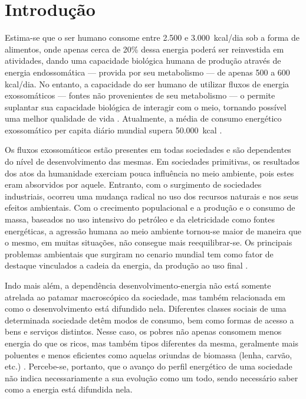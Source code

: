 \chapter{Introdução}

Estima-se que o ser humano consome entre 2.500 e 3.000~\acrshort{kcal}/dia sob a 
forma de alimentos, onde apenas cerca de 20\% dessa energia poderá ser 
reinvestida em atividades, dando uma capacidade biológica humana de produção
através de energia endossomática --- provida por seu metabolismo --- de 
apenas 500 a 600 \acrshort{kcal}/dia. No entanto, a capacidade do ser humano de
utilizar fluxos de energia exossomáticos --- fontes não provenientes de seu metabolismo 
--- o permite suplantar sua capacidade biológica de interagir com o meio,
tornando possível uma melhor qualidade de vida \cite{rippel}. 
Atualmente, a média de consumo energético exossomático per capita diário 
mundial supera 50.000~\acrshort{kcal} \cite{world_statics_2012}.

Os fluxos exossomáticos estão presentes em todas sociedades e são dependentes do
nível de desenvolvimento das mesmas. Em sociedades primitivas, os resultados dos
atos da humanidade exerciam pouca influência no meio ambiente, pois estes eram
absorvidos por aquele. Entranto, com o surgimento de sociedades industriais,
ocorreu uma mudança radical no uso dos recursos naturais e nos seus efeitos
ambientais. Com o crecimento populacional e a produção e o consumo de massa, 
baseados no uso intensivo do petróleo e da eletricidade 
como fontes energéticas, a agressão humana ao meio 
ambiente tornou-se maior de maneira que o mesmo, em muitas situações, não 
consegue mais reequilibrar-se. Os principais problemas ambientais que surgiram 
no cenario mundial tem como fator de destaque vinculados a cadeia da energia, 
da produção ao uso final \cite{rippel,jatoba}.

Indo mais além, a dependência desenvolvimento-energia não está somente atrelada
ao patamar macroscópico da sociedade, mas também relacionada em como o
desenvolvimento está difundido nela. Diferentes classes sociais de uma
determinada sociedade detêm modos de consumo, bem como formas de acesso a bens e
serviços distintos. Nesse caso, os pobres não apenas consomem menos
energia do que os ricos, mas também tipos diferentes da mesma, geralmente mais
poluentes e menos eficientes como aquelas oriundas de biomassa (lenha, carvão,
etc.) \cite{rippel}. Percebe-se, portanto, que o avanço do perfil energético de
uma sociedade não indica necessariamente a sua evolução como um todo, sendo
necessário saber como a energia está difundida nela.

